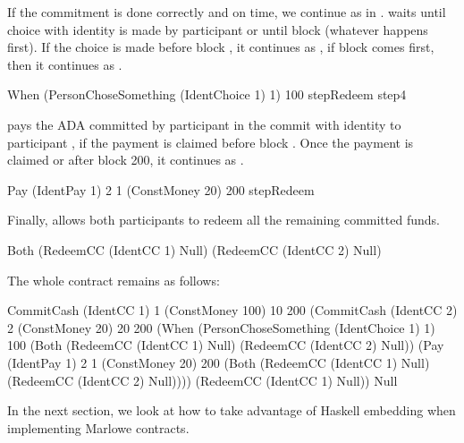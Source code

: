 \documentclass[runningheads]{llncs}
\begin{document}
{If the commitment is done correctly and on time, we continue as in . 
waits until choice with identity  is made by participant  or
until block  (whatever happens first). If the choice is made before block , 
it continues as , if block  comes first, then it continues as 
.

\begin{haskellcode}
When (PersonChoseSomething (IdentChoice 1) 1) 100
     stepRedeem
     step4
\end{haskellcode}

 pays the  ADA committed by participant  in the commit with 
identity  to participant , if the payment is claimed before block 
. Once the payment is claimed or after block 200, it continues as .

\begin{haskellcode}
Pay (IdentPay 1) 2 1 (ConstMoney 20) 200 stepRedeem
\end{haskellcode}

Finally,  allows both participants to redeem all the remaining committed funds.

\begin{haskellcode}
Both (RedeemCC (IdentCC 1) Null)
     (RedeemCC (IdentCC 2) Null)
\end{haskellcode}

The whole contract remains as follows:
\begin{haskellcode}
CommitCash (IdentCC 1) 1
           (ConstMoney 100)
           10 200
           (CommitCash (IdentCC 2) 2
                       (ConstMoney 20)
                       20 200
                       (When (PersonChoseSomething (IdentChoice 1) 1)
                             100
                             (Both (RedeemCC (IdentCC 1) Null)
                                   (RedeemCC (IdentCC 2) Null))
                             (Pay (IdentPay 1) 2 1
                                  (ConstMoney 20)
                                  200
                                  (Both (RedeemCC (IdentCC 1) Null)
                                        (RedeemCC (IdentCC 2) Null))))
                       (RedeemCC (IdentCC 1) Null))
           Null
\end{haskellcode}

In the next section, we look at how to take advantage of Haskell embedding when implementing Marlowe contracts.


} %
\end{document}
